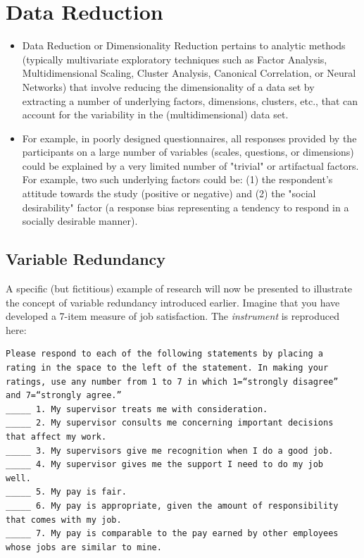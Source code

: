 \documentclass[a4paper,12pt]{article}
\begin{document}
\section{Data Reduction}
\begin{itemize}
\item Data Reduction or Dimensionality Reduction pertains to analytic methods (typically multivariate exploratory techniques such as Factor Analysis, Multidimensional Scaling, Cluster Analysis, Canonical Correlation, or Neural Networks) that involve reducing the dimensionality of a data set by extracting a number of underlying factors, dimensions, clusters, etc., that can account for the variability in the (multidimensional) data set.

\item For example, in poorly designed questionnaires, all responses provided by the participants on a large number of variables (scales, questions, or dimensions) could be explained by a very limited number of "trivial" or artifactual factors. For example, two such underlying factors could be: (1) the respondent's attitude towards the study (positive or negative) and (2) the "social desirability" factor (a response bias representing a tendency to respond in a socially desirable manner).
\end{itemize}
\subsection{Variable Redundancy}
A specific (but fictitious) example of research will now be presented to illustrate the concept of
variable redundancy introduced earlier. Imagine that you have developed a 7-item measure of
job satisfaction. The \emph{instrument} is reproduced here:


\begin{framed}
\begin{verbatim}
Please respond to each of the following statements by placing a
rating in the space to the left of the statement. In making your
ratings, use any number from 1 to 7 in which 1=“strongly disagree”
and 7=“strongly agree.”
_____ 1. My supervisor treats me with consideration.
_____ 2. My supervisor consults me concerning important decisions
that affect my work.
_____ 3. My supervisors give me recognition when I do a good job.
_____ 4. My supervisor gives me the support I need to do my job
well.
_____ 5. My pay is fair.
_____ 6. My pay is appropriate, given the amount of responsibility
that comes with my job.
_____ 7. My pay is comparable to the pay earned by other employees
whose jobs are similar to mine.
\end{verbatim}
\end{framed}
\end{document}
